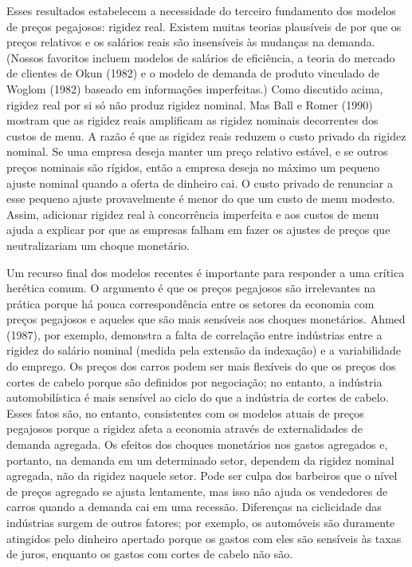 \documentclass[a4paper,12pt]{article}[abntex2]
\begin{document}
Esses resultados estabelecem a necessidade do terceiro fundamento dos modelos de preços pegajosos: rigidez real. Existem muitas teorias plausíveis de por que os preços relativos e os salários reais são insensíveis às mudanças na demanda. (Nossos favoritos incluem modelos de salários de eficiência, a teoria do mercado de clientes de Okun (1982) e o modelo de demanda de produto vinculado de Woglom (1982) baseado em informações imperfeitas.) Como discutido acima, rigidez real por si só não produz rigidez nominal. Mas Ball e Romer (1990) mostram que as rigidez reais amplificam as rigidez nominais decorrentes dos custos de menu. A razão é que as rigidez reais reduzem o custo privado da rigidez nominal. Se uma empresa deseja manter um preço relativo estável, e se outros preços nominais são rígidos, então a empresa deseja no máximo um pequeno ajuste nominal quando a oferta de dinheiro cai. O custo privado de renunciar a esse pequeno ajuste provavelmente é menor do que um custo de menu modesto. Assim, adicionar rigidez real à concorrência imperfeita e aos custos de menu ajuda a explicar por que as empresas falham em fazer os ajustes de preços que neutralizariam um choque monetário.

Um recurso final dos modelos recentes é importante para responder a uma crítica herética comum. O argumento é que os preços pegajosos são irrelevantes na prática porque há pouca correspondência entre os setores da economia com preços pegajosos e aqueles que são mais sensíveis aos choques monetários. Ahmed (1987), por exemplo, demonstra a falta de correlação entre indústrias entre a rigidez do salário nominal (medida pela extensão da indexação) e a variabilidade do emprego. Os preços dos carros podem ser mais flexíveis do que os preços dos cortes de cabelo porque são definidos por negociação; no entanto, a indústria automobilística é mais sensível ao ciclo do que a indústria de cortes de cabelo. Esses fatos são, no entanto, consistentes com os modelos atuais de preços pegajosos porque a rigidez afeta a economia através de externalidades de demanda agregada. Os efeitos dos choques monetários nos gastos agregados e, portanto, na demanda em um determinado setor, dependem da rigidez nominal agregada, não da rigidez naquele setor. Pode ser culpa dos barbeiros que o nível de preços agregado se ajusta lentamente, mas isso não ajuda os vendedores de carros quando a demanda cai em uma recessão. Diferenças na ciclicidade das indústrias surgem de outros fatores; por exemplo, os automóveis são duramente atingidos pelo dinheiro apertado porque os gastos com eles são sensíveis às taxas de juros, enquanto os gastos com cortes de cabelo não são.
\end{document}
